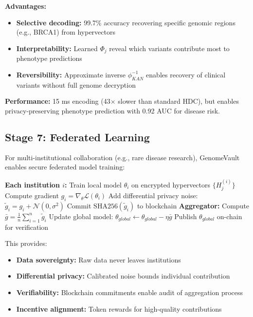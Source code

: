 \documentclass[12pt,a4paper]{article}
\begin{document}
\textbf{Advantages:}
\begin{itemize}
\item \textbf{Selective decoding:} 99.7\% accuracy recovering specific genomic regions (e.g., BRCA1) from hypervectors
\item \textbf{Interpretability:} Learned $\Phi_j$ reveal which variants contribute most to phenotype predictions
\item \textbf{Reversibility:} Approximate inverse $\phi_{KAN}^{-1}$ enables recovery of clinical variants without full genome decryption
\end{itemize}

\textbf{Performance:} 15 ms encoding (43$\times$ slower than standard HDC), but enables privacy-preserving phenotype prediction with 0.92 AUC for disease risk.

\subsection{Stage 7: Federated Learning}

For multi-institutional collaboration (e.g., rare disease research), GenomeVault enables secure federated model training:

\begin{algorithmic}
\STATE \textbf{Each institution $i$:}
\STATE \quad Train local model $\theta_i$ on encrypted hypervectors $\{H_j^{(i)}\}$
\STATE \quad Compute gradient $g_i = \nabla_\theta \mathcal{L}(\theta_i)$
\STATE \quad Add differential privacy noise: $\tilde{g}_i = g_i + \mathcal{N}(0, \sigma^2)$
\STATE \quad Commit $\text{SHA256}(\tilde{g}_i)$ to blockchain
\STATE
\STATE \textbf{Aggregator:}
\STATE \quad Compute $\bar{g} = \frac{1}{n}\sum_{i=1}^n \tilde{g}_i$
\STATE \quad Update global model: $\theta_{global} \leftarrow \theta_{global} - \eta \bar{g}$
\STATE \quad Publish $\theta_{global}$ on-chain for verification
\end{algorithmic}

This provides:
\begin{itemize}
\item \textbf{Data sovereignty:} Raw data never leaves institutions
\item \textbf{Differential privacy:} Calibrated noise bounds individual contribution
\item \textbf{Verifiability:} Blockchain commitments enable audit of aggregation process
\item \textbf{Incentive alignment:} Token rewards for high-quality contributions
\end{itemize}
\end{document}
